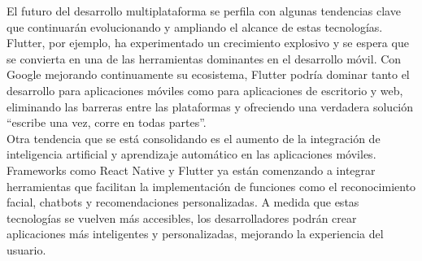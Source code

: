 El futuro del desarrollo multiplataforma se perfila con algunas tendencias clave que continuarán evolucionando y ampliando
el alcance de estas tecnologías. Flutter, por ejemplo, ha experimentado un crecimiento explosivo y se espera que se convierta
en una de las herramientas dominantes en el desarrollo móvil. Con Google mejorando continuamente su ecosistema, Flutter
podría dominar tanto el desarrollo para aplicaciones móviles como para aplicaciones de escritorio y web, eliminando
las barreras entre las plataformas y ofreciendo una verdadera solución “escribe una vez, corre en todas partes”.\\

Otra tendencia que se está consolidando es el aumento de la integración de inteligencia artificial y aprendizaje automático
en las aplicaciones móviles. Frameworks como React Native y Flutter ya están comenzando a integrar herramientas que
facilitan la implementación de funciones como el reconocimiento facial, chatbots y recomendaciones personalizadas.
A medida que estas tecnologías se vuelven más accesibles, los desarrolladores podrán crear aplicaciones más inteligentes
y personalizadas, mejorando la experiencia del usuario.
